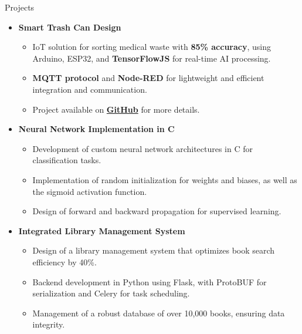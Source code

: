 \documentclass{resume}
\begin{document}
\begin{rSection}{Projects}
    \vspace{-0.25em}
    \newcommand\tab[1][1cm]{\hspace*{#1}}
    \begin{itemize}[leftmargin=*,label= ]
        \setlength{\itemsep}{-6pt}
        
        \item \textbf{\large Smart Trash Can Design}
        \begin{itemize}
            \setlength{\itemsep}{-6pt}
            \item IoT solution for sorting medical waste with \textbf{85\% accuracy}, using Arduino, ESP32, and \textbf{TensorFlowJS} for real-time AI processing.
            \item \textbf{MQTT protocol} and \textbf{Node-RED} for lightweight and efficient integration and communication.
            \item Project available on \href{https://github.com/evry-paris-saclay/2023-m2cns-rd-ChaineDeValeurs}{\textbf{GitHub}} for more details.
        \end{itemize}
        
        \item \textbf{\large Neural Network Implementation in C} 
        \begin{itemize}
            \setlength{\itemsep}{-6pt} %
            \item Development of custom neural network architectures in C for classification tasks.
            \item Implementation of random initialization for weights and biases, as well as the sigmoid activation function.
            \item Design of forward and backward propagation for supervised learning.
        \end{itemize}
        
        \item \textbf{\large Integrated Library Management System}
        \begin{itemize}
            \setlength{\itemsep}{-6pt} %
            \item Design of a library management system that optimizes book search efficiency by 40\%.
            \item Backend development in Python using Flask, with ProtoBUF for serialization and Celery for task scheduling.
            \item Management of a robust database of over 10,000 books, ensuring data integrity.
        \end{itemize}
        

\end{itemize}
\end{rSection}
\end{document}
